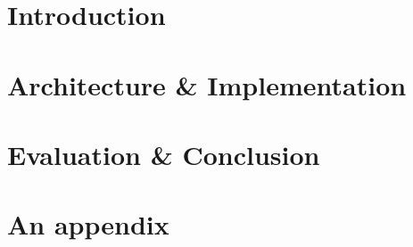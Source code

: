 \documentclass[ twoside,openright,titlepage,numbers=noenddot,headinclude,%
                footinclude=true,cleardoublepage=empty,abstractoff, %
                BCOR=5mm,paper=a4,fontsize=11pt,%
                ngerman,american,%
                ]{scrreprt}
\begin{document}
\frenchspacing
\raggedbottom
{} %
\pagestyle{plain}



\pagestyle{scrheadings}
\cleardoublepage
\cleardoublepage{}
\cleardoublepage



\chapter{Introduction}
\label{cha:introduction}


\chapter{Architecture \& Implementation}
\label{cha:arch--impl}

\chapter{Evaluation \& Conclusion}
\label{cha:evaluation}



\appendix
\cleardoublepage

\chapter{An appendix}
\label{cha:an-appendix}



\cleardoublepage

\end{document}
